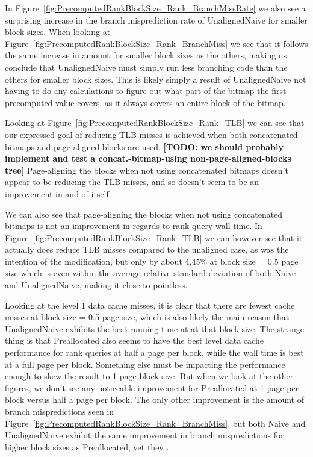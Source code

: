 In Figure~\ref{fig:PrecomputedRankBlockSize_Rank_BranchMissRate} we also see a surprising increase in the branch misprediction rate of UnalignedNaive for smaller block sizes.
When looking at Figure~\ref{fig:PrecomputedRankBlockSize_Rank_BranchMiss} we see that it follows the same increase in amount for smaller block sizes as the others, making us conclude that UnalignedNaive must simply run less branching code than the others for smaller block sizes.
This is likely simply a result of UnalignedNaive not having to do any calculations to figure out what part of the bitmap the first precomputed value covers, as it always covers an entire block of the bitmap.

Looking at Figure~\ref{fig:PrecomputedRankBlockSize_Rank_TLB} we can see that our expressed goal of reducing TLB misses is achieved when both concatenated bitmaps and page-aligned blocks are used. \textbf{[TODO: we should probably implement and test a concat.-bitmap-using non-page-aligned-blocks tree]}
Page-aligning the blocks when not using concatenated bitmaps doesn't appear to be reducing the TLB misses, and so doesn't seem to be an improvement in and of itself.



We can also see that page-aligning the blocks when not using concatenated bitmaps is not an improvement in regards to rank query wall time.
In Figure~\ref{fig:PrecomputedRankBlockSize_Rank_TLB} we can however see that it actually does reduce TLB misses compared to the unaligned case, as was the intention of the modification, but only by about 4,45\% at block size = 0.5 page size which is even within the average relative standard deviation of both Naive and UnalignedNaive, making it close to pointless.



Looking at the level 1 data cache misses, it is clear that there are fewest cache misses at block size = 0.5 page size, which is also likely the main reason that UnalignedNaive exhibits the best running time at at that block size.
The strange thing is that Preallocated also seems to have the best level data cache performance for rank queries at half a page per block, while the wall time is best at a full page per block.
Something else must be impacting the performance enough to skew the result to 1 page block size.
But when we look at the other figures, we don't see any noticeable improvement for Preallocated at 1 page per block versus half a page per block.
The only other improvement is the amount of branch mispredictions seen in Figure~\ref{fig:PrecomputedRankBlockSize_Rank_BranchMiss}, but both Naive and UnalignedNaive exhibit the same improvement in branch mispredictions for higher block sizes as Preallocated, yet they .

